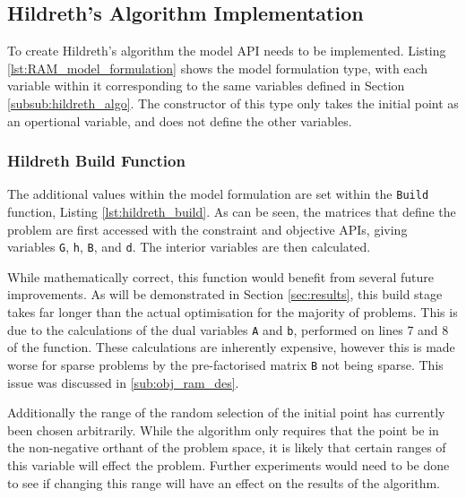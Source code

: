 \subsection{Hildreth's Algorithm Implementation}\label{sub:hildreth_implementation}

To create Hildreth's algorithm the model API needs to be implemented. Listing \ref{lst:RAM_model_formulation} shows the model formulation type, with each variable within it corresponding to the same variables defined in Section \ref{subsub:hildreth_algo}. The constructor of this type only takes the initial point as an opertional variable, and does not define the other variables. 

\subsubsection{Hildreth Build Function}

The additional values within the model formulation are set within the \texttt{Build} function, Listing \ref{lst:hildreth_build}. As can be seen, the matrices that define the problem are first accessed with the constraint and objective APIs, giving variables \texttt{G}, \texttt{h}, \texttt{B}, and \texttt{d}. The interior variables are then calculated. 



While mathematically correct, this function would benefit from several future improvements. As will be demonstrated in Section \ref{sec:results}, this build stage takes far longer than the actual optimisation for the majority of problems. This is due to the calculations of the dual variables \texttt{A} and \texttt{b}, performed on lines 7 and 8 of the function. These calculations are inherently expensive, however this is made worse for sparse problems by the pre-factorised matrix \texttt{B} not being sparse. This issue was discussed in \ref{sub:obj_ram_des}.

Additionally the range of the random selection of the initial point has currently been chosen arbitrarily. While the algorithm only requires that the point be in the non-negative orthant of the problem space, it is likely that certain ranges of this variable will effect the problem. Further experiments would need to be done to see if changing this range will have an effect on the results of the algorithm.

